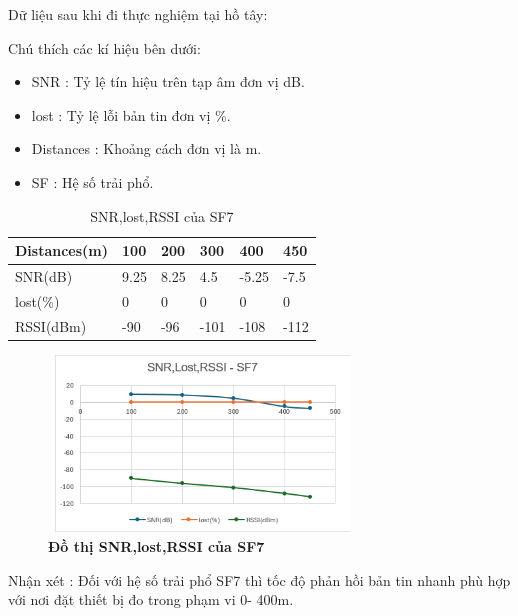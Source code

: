 \documentclass{article} %
\begin{document}
	Dữ liệu sau khi đi thực nghiệm tại hồ tây:
	
	Chú thích các kí hiệu bên dưới:
	
	\begin{itemize}
		\item SNR : Tỷ lệ tín hiệu trên tạp âm đơn vị dB.
		\item lost : Tỷ lệ lỗi bản tin đơn vị \%.
		\item Distances : Khoảng cách đơn vị là m.
		\item  SF : Hệ số trải phổ.
	\end{itemize}	
	
	\begin{table}[H]
		\centering
		\begin{tabular}{|l|l|l|l|l|l|}
			\hline
			\textbf{Distances(m)} & \textbf{100} & \textbf{200} & \textbf{300} & \textbf{400} & \textbf{450} \\ \hline
			SNR(dB)      & 9.25          & 8.25          & 4.5          & -5.25         & -7.5         \\ \hline
			lost(\%)   & 0         & 0         & 0         & 0         & 0         \\ \hline
			RSSI(dBm)  & -90          & -96          & -101         & -108         & -112         \\ \hline
		\end{tabular}
		\caption{SNR,lost,RSSI của SF7}
		\label{SF7}
	\end{table}
	
	\begin{figure}[!ht]
		\centering
		\includegraphics[width=8.2cm,height=4.7cm]{Images/sf7.png}
		\caption[ Đồ thị SNR,lost,RSSI của SF7 ]{\bfseries \fontsize{12pt}{0pt}\selectfont  Đồ thị SNR,lost,RSSI của SF7}
		\label{sf7}
	\end{figure}
	
	Nhận xét : Đối với hệ số trải phổ SF7 thì tốc độ phản hồi bản tin nhanh phù hợp với nơi đặt thiết bị đo trong phạm vi 0- 400m.
	
\end{document}
